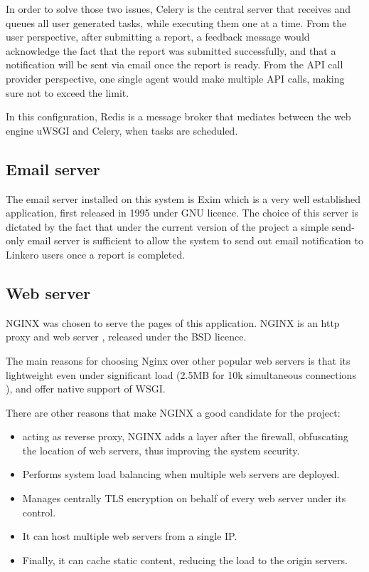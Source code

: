 In order to solve those two issues, Celery is the central server that receives
and queues all user generated tasks, while executing them one at a time. From
the user perspective, after submitting a report, a feedback message would
acknowledge the fact that the report was submitted successfully, and that a
notification will be sent via email once the report is ready. From the API call
provider perspective, one single agent would make multiple API calls, making
sure not to exceed the limit.

In this configuration, Redis is a message broker that mediates between the web
engine uWSGI and Celery, when tasks are scheduled.

\subsection{Email server}
The email server installed on this system is Exim \cite{exim} which is a very
well established application, first released in 1995 under GNU licence. The
choice of this server is dictated by the fact that under the current version of
the project a simple send-only email server is sufficient to allow the system to
send out email notification to Linkero users once a report is completed.

\subsection{Web server}
NGINX was chosen to serve the pages of this application. NGINX is an http proxy
and web server \cite{Nginx}, released under the BSD licence.

The main reasons for choosing Nginx over other popular web servers is that its
lightweight even under significant load (2.5MB for 10k simultaneous connections
\cite{wkngx}), and offer native support of WSGI.

There are other reasons that make NGINX a good candidate for the project:
\begin{itemize}
  \item acting as reverse proxy, NGINX adds a layer after the firewall,
  obfuscating the location of web servers, thus improving the system security.
  \item Performs system load balancing when multiple web servers are deployed.
  \item Manages centrally TLS encryption on behalf of every web server under its
  control.
  \item It can host multiple web servers from a single IP.
  \item Finally, it can cache static content, reducing the load to the origin
  servers.
\end{itemize}

